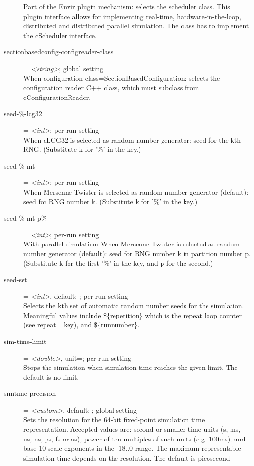 \begin{description}
    Part of the Envir plugin mechanism: selects the scheduler class. This
    plugin interface allows for implementing real-time, hardware-in-the-loop,
    distributed and distributed parallel simulation. The class has to implement
    the cScheduler interface.
\item[sectionbasedconfig-configreader-class] = \textit{<string>}; global setting \\
    When configuration-class=SectionBasedConfiguration: selects the
    configuration reader C++ class, which must subclass from
    cConfigurationReader.
\item[seed-\%-lcg32] = \textit{<int>}; per-run setting \\
    When cLCG32 is selected as random number generator: seed for the kth RNG.
    (Substitute k for '\%' in the key.)
\item[seed-\%-mt] = \textit{<int>}; per-run setting \\
    When Mersenne Twister is selected as random number generator (default):
    seed for RNG number k. (Substitute k for '\%' in the key.)
\item[seed-\%-mt-p\%] = \textit{<int>}; per-run setting \\
    With parallel simulation: When Mersenne Twister is selected as random
    number generator (default): seed for RNG number k in partition number p.
    (Substitute k for the first '\%' in the key, and p for the second.)
\item[seed-set] = \textit{<int>}, default: ; per-run setting \\
    Selects the kth set of automatic random number seeds for the simulation.
    Meaningful values include \$\{repetition\} which is the repeat loop counter
    (see repeat= key), and \$\{runnumber\}.
\item[sim-time-limit] = \textit{<double>}, unit=; per-run setting \\
    Stops the simulation when simulation time reaches the given limit. The
    default is no limit.
\item[simtime-precision] = \textit{<custom>}, default: ; global setting \\
    Sets the resolution for the 64-bit fixed-point simulation time
    representation. Accepted values are: second-or-smaller time units (s, ms,
    us, ns, ps, fs or as), power-of-ten multiples of such units (e.g. 100ms),
    and base-10 scale exponents in the -18..0 range. The maximum representable
    simulation time depends on the resolution. The default is picosecond

\end{description}
